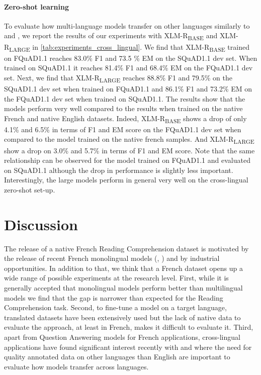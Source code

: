 \documentclass{article}
\begin{document}
\paragraph{Zero-shot learning}
To evaluate how multi-language models transfer on other languages similarly to \cite{mlqa} and \cite{xquad}, we report the results of our experiments with XLM-R\textsubscript{BASE} and XLM-R\textsubscript{LARGE} in \ref{tab:experiments_cross_lingual}.
We find that XLM-R\textsubscript{BASE} trained on FQuAD1.1 reaches 83.0\% F1 and 73.5 \% EM on the SQuAD1.1 dev set.
When trained on SQuAD1.1 it reaches 81.4\% F1 and 68.4\% EM on the FQuAD1.1 dev set.
Next, we find that XLM-R\textsubscript{LARGE} reaches 88.8\% F1 and 79.5\% on the SQuAD1.1 dev set when trained on FQuAD1.1 and 86.1\% F1 and 73.2\% EM on the FQuAD1.1 dev set when trained on SQuAD1.1.
The results show that the models perform very well compared to the results when trained on the native French and native English datasets.
Indeed, XLM-R\textsubscript{BASE} shows a drop of only 4.1\% and 6.5\% in terms of F1 and EM score on the FQuAD1.1 dev set when compared to the model trained on the native french samples.
And XLM-R\textsubscript{LARGE} show a drop on 3.0\% and 5.7\% in terms of F1 and EM score.
Note that the same relationship can be observed for the model trained on FQuAD1.1 and evaluated on SQuAD1.1 although the drop in performance is slightly less important.
Interestingly, the large models perform in general very well on the cross-lingual zero-shot set-up.
























%
 
\section{Discussion}
\label{section:discussion}
The release of a native French Reading Comprehension dataset is motivated by the release of recent French monolingual models (\cite{camembert}, \cite{flaubert}) and by industrial opportunities.
In addition to that, we think that a French dataset opens up a wide range of possible experiments at the research level.
First, while it is generally accepted that monolingual models perform better than multilingual models we find that the gap is narrower than expected for the Reading Comprehension task.
Second, to fine-tune a model on a target language, translated datasets have been extensively used but the lack of native data to evaluate the approach, at least in French, makes it difficult to evaluate it.
Third, apart from Question Answering models for French applications, cross-lingual applications have found significant interest recently with \citep{xquad} and \citep{mlqa} where the need for quality annotated data on other languages than English are important to evaluate how models transfer across languages.
\end{document}
